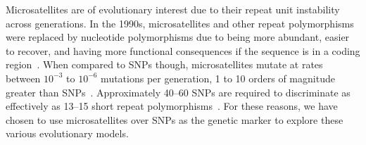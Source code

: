 Microsatellites are of evolutionary interest due to their repeat unit instability across generations.
In the 1990s, microsatellites and other repeat polymorphisms were replaced by nucleotide polymorphisms due to being
more abundant, easier to recover, and having more functional consequences if the sequence is in a coding
region~\cite{graySingleNucleotidePolymorphisms2000,butlerSTRsVsSNPs2007}.
When compared to SNPs though, microsatellites mutate at rates between $10^{-3}$ to $10^{-6}$ mutations per generation,
1 to 10 orders of magnitude greater than SNPs~\cite{gemayelJunkVariableTandemRepeats2012}.
Approximately 40--60 SNPs are required to discriminate as effectively as 13--15 short repeat
polymorphisms~\cite{butlerSTRsVsSNPs2007}.
For these reasons, we have chosen to use microsatellites over SNPs as the genetic marker to explore
these various evolutionary models.
